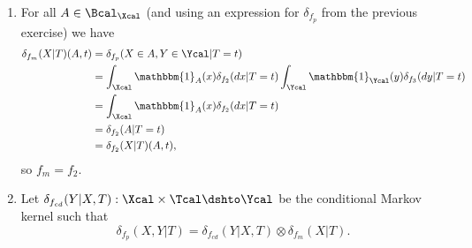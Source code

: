 \begin{enumerate}
\begin{gradedsolution}
\begin{enumerate}
\begin{enumerate}
      \item $\{A\times B: A\in\Bcal_\Xcal , B\in \Bcal_\Ycal\}$ is a $\pi$-system.
    \end{enumerate}
    So, we have to test the provided equality only on sets $A\times B: A\in\Bcal_\Xcal, B\in\Bcal_\Ycal$. For all such $A$ and $B$ and $t\in\Tcal$ we have
    \begin{align*}
      [\delta_{f_2}(X|T)\otimes \delta_{f_3}(Y|T)](A\times B, t) &= \int_\Xcal\int_\Ycal \mathbbm{1}_{A\times B}(x, y)\delta_{f_2}(dx|T=t)\delta_{f_3}(dx|T=t) \\
      &= \int_\Xcal\int_\Ycal \mathbbm{1}_{A}(x)\mathbbm{1}_{B}(y)\delta_{f_2}(dx|T=t)\delta_{f_3}(dx|T=t) \\
      &= \int_\Xcal \mathbbm{1}_{A}(x)\delta_{f_2}(dx|T=t)\int_\Ycal\mathbbm{1}_{B}(y)\delta_{f_3}(dx|T=t) \\
      &= \delta_{f_2}(A|T=t)\delta_{f_3}(B|T=t) \\
      &= \mathbbm{1}_{A}(f_2(t))\mathbbm{1}_{B}(f_3(t)) \\
      &= \mathbbm{1}_{A\times B}(f_2(t), f_3(t)) \\
      &= \delta_{(f_2, f_3)}(A\times B|T=t) \\
      &= [\delta_{(f_2, f_3)}(X, Y|T)](A\times B, t) \\
      &=: [\delta_{f_p}(X, Y|T)](A\times B, t),
    \end{align*}
    so $f_p = (f_2, f_3)$.
    \item For all $A\in \Bcal_\Xcal$ (and using an expression for $\delta_{f_p}$ from the previous exercise) we have
    \begin{align*}
      \delta_{f_m}(X|T)(A, t) &= \delta_{f_p}(X\in A, Y\in\Ycal|T=t) \\
      &= \int_\Xcal\mathbbm{1}_A(x)\delta_{f_2}(dx|T=t)\int_\Ycal\mathbbm{1}_\Ycal(y)\delta_{f_3}(dy|T=t) \\
      &= \int_\Xcal\mathbbm{1}_A(x)\delta_{f_2}(dx|T=t) \\
      &= \delta_{f_2}(A|T=t) \\
      &= \delta_{f_2}(X|T)(A, t),
    \end{align*}
    so $f_m = f_2$.
    \item Let $\delta_{f_{cd}}(Y|X, T): \Xcal\times \Tcal \dshto \Ycal$ be the conditional Markov kernel such that
    \begin{equation}\label{foo}
      \delta_{f_p}(X, Y|T) = \delta_{f_{cd}}(Y|X, T) \otimes \delta_{f_m}(X|T).
    \end{equation}

\end{enumerate}
\end{gradedsolution}
\end{enumerate}
